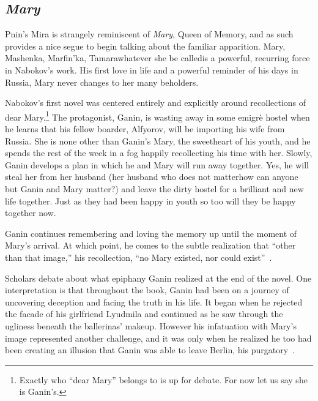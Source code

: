\subsection{\emph{Mary}}
Pnin's Mira is strangely reminiscent of \emph{Mary}, Queen of Memory, and as such provides a nice segue to begin talking about the familiar apparition.
Mary, Mashenka, Marfin'ka, Tamara\textemdash whatever she be called\textemdash is a powerful, recurring force in Nabokov's work.
His first love in life and a powerful reminder of his days in Russia, Mary never changes to her many beholders.

Nabokov's first novel was centered entirely and explicitly around recollections of dear Mary.\footnote{Exactly who ``dear Mary'' belongs to is up for debate. For now let us say she is Ganin's.}
The protagonist, Ganin, is wasting away in some emigr\`e hostel when he learns that his fellow boarder, Alfyorov, will be importing his wife from Russia.
She is none other than Ganin's Mary, the sweetheart of his youth, and he spends the rest of the week in a fog happily recollecting his time with her.
Slowly, Ganin develops a plan in which he and Mary will run away together. 
Yes, he will steal her from her husband (her husband who does not matter\textemdash how can anyone but Ganin and Mary matter?) and leave the dirty hostel for a brilliant and new life together.
Just as they had been happy in youth so too will they be happy together now.

Ganin continues remembering and loving the memory up until the moment of Mary's arrival.
At which point, he comes to the subtle realization that ``other than that image,'' his recollection, ``no Mary existed, nor could exist''~\cite[135]{mary}.

Scholars debate about what epiphany Ganin realized at the end of the novel.
One interpretation is that throughout the book, Ganin had been on a journey of uncovering deception and facing the truth in his life.
It began when he rejected the facade of his girlfriend Lyudmila and continued as he saw through the ugliness beneath the ballerinas' makeup.
However his infatuation with Mary's image represented another challenge, and it was only when he realized he too had been creating an illusion that Ganin was able to leave Berlin, his purgatory~\cite[61]{laursen1996memory}.

